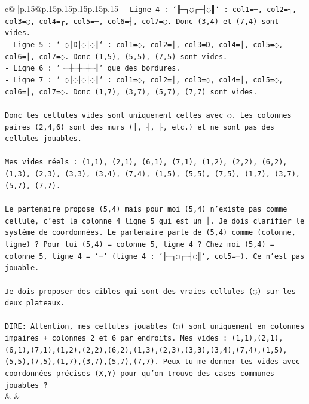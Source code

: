 \documentclass{article}
\begin{document}
{\begin{supertabular}{c@{$\;$}|p{.15\linewidth}@{}p{.15\linewidth}p{.15\linewidth}p{.15\linewidth}p{.15\linewidth}p{.15\linewidth}}
{{{\texttt{{-} Ligne 4 : `╟─┐◌┌─┤◌║` : col1=─, col2=┐, col3=◌, col4=┌, col5=─, col6=┤, col7=◌. Donc (3,4) et (7,4) sont vides.} \\
\texttt{{-} Ligne 5 : `║◌│D│◌│◌║` : col1=◌, col2=│, col3=D, col4=│, col5=◌, col6=│, col7=◌. Donc (1,5), (5,5), (7,5) sont vides.} \\
\texttt{{-} Ligne 6 : `╟─┼─┼─┼─╢` que des bordures.} \\
\texttt{{-} Ligne 7 : `║◌│◌│◌│◌║` : col1=◌, col2=│, col3=◌, col4=│, col5=◌, col6=│, col7=◌. Donc (1,7), (3,7), (5,7), (7,7) sont vides.} \\
\\ 
\texttt{Donc les cellules vides sont uniquement celles avec ◌. Les colonnes paires (2,4,6) sont des murs (│, ┤, ├, etc.) et ne sont pas des cellules jouables.} \\
\\ 
\texttt{Mes vides réels : (1,1), (2,1), (6,1), (7,1), (1,2), (2,2), (6,2), (1,3), (2,3), (3,3), (3,4), (7,4), (1,5), (5,5), (7,5), (1,7), (3,7), (5,7), (7,7).} \\
\\ 
\texttt{Le partenaire propose (5,4) mais pour moi (5,4) n'existe pas comme cellule, c'est la colonne 4 ligne 5 qui est un │. Je dois clarifier le système de coordonnées. Le partenaire parle de (5,4) comme (colonne, ligne) ? Pour lui (5,4) = colonne 5, ligne 4 ? Chez moi (5,4) = colonne 5, ligne 4 = `─` (ligne 4 : `╟─┐◌┌─┤◌║`, col5=─). Ce n'est pas jouable.} \\
\\ 
\texttt{Je dois proposer des cibles qui sont des vraies cellules (◌) sur les deux plateaux.} \\
\\ 
\texttt{DIRE: Attention, mes cellules jouables (◌) sont uniquement en colonnes impaires + colonnes 2 et 6 par endroits. Mes vides : (1,1),(2,1),(6,1),(7,1),(1,2),(2,2),(6,2),(1,3),(2,3),(3,3),(3,4),(7,4),(1,5),(5,5),(7,5),(1,7),(3,7),(5,7),(7,7). Peux{-}tu me donner tes vides avec coordonnées précises (X,Y) pour qu'on trouve des cases communes jouables ?} \\
            }
        }
    }
    & & \\ \\


\end{supertabular}}
\end{document}
